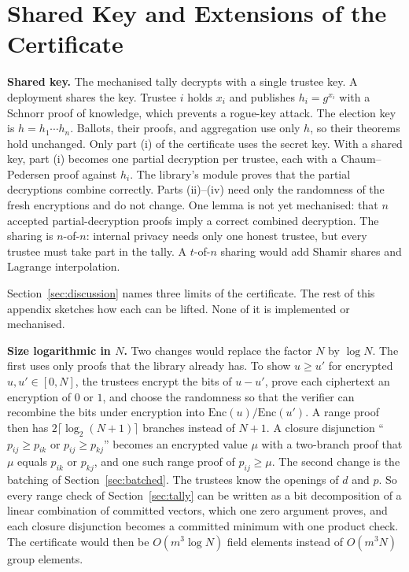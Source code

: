 \section{Shared Key and Extensions of the Certificate}\label{app:extensions}
\textbf{Shared key.} The mechanised tally decrypts with a single trustee
key. A deployment shares the key. Trustee $i$ holds $x_i$ and publishes
$h_i = g^{x_i}$ with a Schnorr proof of knowledge, which prevents a
rogue-key attack. The election key is $h = h_1 \cdots h_n$. Ballots,
their proofs, and aggregation use only $h$, so their theorems hold
unchanged. Only part (i) of the certificate uses the secret key. With a
shared key, part (i) becomes one partial decryption per trustee, each
with a Chaum--Pedersen proof against $h_i$. The library's
 module proves that the partial decryptions combine
correctly. Parts (ii)--(iv) need only the randomness of the fresh
encryptions and do not change. One lemma is not yet mechanised: that $n$
accepted partial-decryption proofs imply a correct combined decryption.
The sharing is $n$-of-$n$: internal privacy needs only one honest
trustee, but every trustee must take part in the tally. A $t$-of-$n$ sharing would
add Shamir shares and Lagrange interpolation.

Section~\ref{sec:discussion} names three limits of the certificate. The
rest of this appendix sketches how each can be lifted. None of it is
implemented or mechanised.

\textbf{Size logarithmic in $N$.} Two changes would replace the factor
$N$ by $\log N$. The first uses only proofs that the library already
has. To show $u \ge u'$ for encrypted $u, u' \in [0, N]$, the trustees
encrypt the bits of $u - u'$, prove each ciphertext an encryption of $0$
or $1$, and choose the randomness so that the verifier can recombine the
bits under encryption into $\mathrm{Enc}(u)/\mathrm{Enc}(u')$. A range
proof then has $2\lceil \log_2 (N+1) \rceil$ branches instead of $N +
1$. A closure disjunction ``$p_{ij} \ge p_{ik}$ or $p_{ij} \ge p_{kj}$''
becomes an encrypted value $\mu$ with a two-branch proof that $\mu$
equals $p_{ik}$ or $p_{kj}$, and one such range proof of $p_{ij} \ge
\mu$. The second change is the batching of Section~\ref{sec:batched}.
The trustees know the openings of $d$ and $p$. So every range check of
Section~\ref{sec:tally} can be written as a bit decomposition of a linear
combination of committed vectors, which one zero argument proves, and
each closure disjunction becomes a committed minimum with one product
check. The certificate would then be $O(m^3 \log N)$ field elements
instead of $O(m^3 N)$ group elements.

